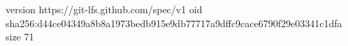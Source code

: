 version https://git-lfs.github.com/spec/v1
oid sha256:d44ce04349a8b8a1973bedb915e9db77717a9dffc9cace6790f29e03341c1dfa
size 71
